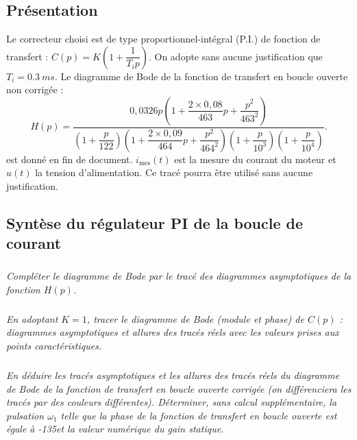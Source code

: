 \setcounter{exo}{0}
\begin{multicols}{2}


\subsection*{Présentation}

Le correcteur choisi est de type proportionnel-intégral (P.I.) de fonction de transfert : $C(p)=K\left(1+\dfrac{1}{T_ip}\right)$. On adopte sans aucune justification que $T_i=\SI{0,3}{ms}$. 
Le diagramme de Bode de la fonction de transfert en boucle ouverte non corrigée : 
\footnotesize
$$
H(p)=\dfrac{
0,0326 p \left( 1+\dfrac{2\times 0,08}{463}p+\dfrac{p^2}{463^2}\right)}
{
\left(1+\dfrac{p}{122} \right)
\left( 1+\dfrac{2\times 0,09}{464}p+\dfrac{p^2}{464^2}\right)
\left(1+\dfrac{p}{10^3} \right)
\left(1+\dfrac{p}{10^4} \right)
}.
$$
\normalsize
est donné en fin de document. $i_{\text{mes}}(t)$ est la mesure du courant du moteur et $u(t)$ la tension d’alimentation. Ce tracé pourra être utilisé sans aucune justification.


\subsection*{Syntèse du régulateur PI de la boucle de courant}
\subparagraph{}\textit{Compléter le diagramme de Bode par le tracé des diagrammes asymptotiques de la fonction $H(p)$.}
\ifprof
\begin{corrige}
\end{corrige}
\else
\fi

\subparagraph{}\textit{En adoptant $K = 1$, tracer le diagramme de Bode
(module et phase) de $C(p)$ : diagrammes asymptotiques et allures des tracés réels avec les valeurs prises aux points caractéristiques.}
\ifprof
\begin{corrige}
\end{corrige}
\else
\fi

\subparagraph{}\textit{En déduire les tracés asymptotiques et les allures des tracés réels du diagramme de Bode de la fonction de transfert en boucle ouverte corrigée (on différenciera les tracés par des
couleurs différentes). Déterminer, sans calcul supplémentaire, la pulsation $\omega_1$ telle que la phase de la fonction
de transfert en boucle ouverte est égale à -135\degres et la valeur numérique du gain statique.
}
\ifprof
\begin{corrige}
\end{corrige}
\else
\fi



\end{multicols}
